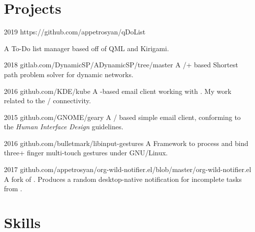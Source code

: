 \documentclass{CurriculumVitae}[10pt, draft]
\begin{document}
\section*{Projects}

 {2019}
{https://github.com/appetrosyan/qDoList}{A To-Do
  list manager based off of QML and Kirigami. 

 {2018}
{gitlab.com/DynamicSP/ADynamicSP/tree/master} {A
  /+ based Shortest path problem solver
  for dynamic networks. }

 {2016} {github.com/KDE/kube} {A -based
  email client working with . My work related to
  the / connectivity. }

 {2015} {github.com/GNOME/geary} {A
  / based simple email client, conforming to
  the  \emph{Human Interface Design} guidelines.}

 {2016}
{github.com/bulletmark/libinput-gestures} {A Framework to process and
  bind three+ finger multi-touch gestures under GNU/Linux. }

 {2017}
{github.com/appetrosyan/org-wild-notifier.el/blob/master/org-wild-notifier.el}
{A fork of . Produces a random desktop-native
  notification for incomplete tasks from . }



\section*{Skills}

\begin{multicols}{4}
  

\end{multicols}}
\end{document}
